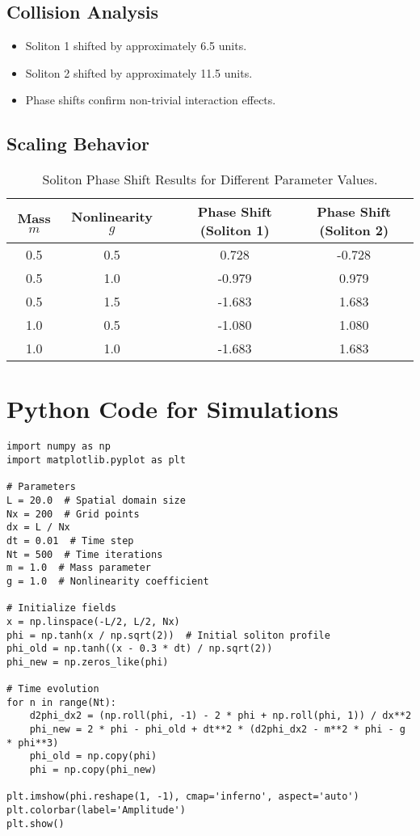 \documentclass{article}
\begin{document}
\subsection{Collision Analysis}
\begin{itemize}
    \item Soliton 1 shifted by approximately 6.5 units.
    \item Soliton 2 shifted by approximately 11.5 units.
    \item Phase shifts confirm non-trivial interaction effects.
\end{itemize}

\subsection{Scaling Behavior}
\begin{table}[h]
    \centering
    \begin{tabular}{ccc|cc}
        \toprule
        Mass \(m\) & Nonlinearity \(g\) & & Phase Shift (Soliton 1) & Phase Shift (Soliton 2) \\
        \midrule
        0.5 & 0.5 & & 0.728 & -0.728 \\
        0.5 & 1.0 & & -0.979 & 0.979 \\
        0.5 & 1.5 & & -1.683 & 1.683 \\
        1.0 & 0.5 & & -1.080 & 1.080 \\
        1.0 & 1.0 & & -1.683 & 1.683 \\
        \bottomrule
    \end{tabular}
    \caption{Soliton Phase Shift Results for Different Parameter Values.}
    \label{tab:scaling}
\end{table}

\section{Python Code for Simulations}
\begin{verbatim}
import numpy as np
import matplotlib.pyplot as plt

# Parameters
L = 20.0  # Spatial domain size
Nx = 200  # Grid points
dx = L / Nx
dt = 0.01  # Time step
Nt = 500  # Time iterations
m = 1.0  # Mass parameter
g = 1.0  # Nonlinearity coefficient

# Initialize fields
x = np.linspace(-L/2, L/2, Nx)
phi = np.tanh(x / np.sqrt(2))  # Initial soliton profile
phi_old = np.tanh((x - 0.3 * dt) / np.sqrt(2))
phi_new = np.zeros_like(phi)

# Time evolution
for n in range(Nt):
    d2phi_dx2 = (np.roll(phi, -1) - 2 * phi + np.roll(phi, 1)) / dx**2
    phi_new = 2 * phi - phi_old + dt**2 * (d2phi_dx2 - m**2 * phi - g * phi**3)
    phi_old = np.copy(phi)
    phi = np.copy(phi_new)

plt.imshow(phi.reshape(1, -1), cmap='inferno', aspect='auto')
plt.colorbar(label='Amplitude')
plt.show()
\end{verbatim}
\end{document}
